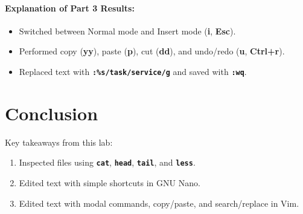 \documentclass[10pt,a4paper]{article}
\newcommand{\cmd}[1]{\texttt{\textbf{#1}}}
\newcommand{\key}[1]{\textbf{\textcolor{termkey}{#1}}}
\begin{document}
\paragraph{Explanation of Part 3 Results:}
\begin{itemize}[noitemsep,topsep=1pt,leftmargin=1.2em]
  \item Switched between Normal mode and Insert mode (\key{i}, \key{Esc}).
  \item Performed copy (\key{yy}), paste (\key{p}), cut (\key{dd}), and undo/redo (\key{u}, \key{Ctrl+r}).
  \item Replaced text with \cmd{:\%s/task/service/g} and saved with \cmd{:wq}.
\end{itemize}

\section{Conclusion}
Key takeaways from this lab:
\begin{enumerate}[noitemsep,topsep=1pt,leftmargin=1.4em]
  \item Inspected files using \cmd{cat}, \cmd{head}, \cmd{tail}, and \cmd{less}.
  \item Edited text with simple shortcuts in GNU Nano.
  \item Edited text with modal commands, copy/paste, and search/replace in Vim.
\end{enumerate}
\end{document}
